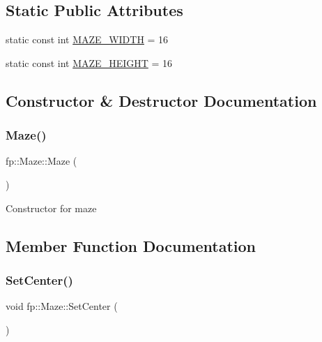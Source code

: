 \subsection*{Static Public Attributes}
\begin{DoxyCompactItemize}
\item 
static const int \hyperlink{classfp_1_1_maze_ae976c87b67bf82c41ede75a19ac28c2c}{M\+A\+Z\+E\+\_\+\+W\+I\+D\+TH} = 16
\item 
static const int \hyperlink{classfp_1_1_maze_a3cee2050b4d60bceacc9307e7016b931}{M\+A\+Z\+E\+\_\+\+H\+E\+I\+G\+HT} = 16
\end{DoxyCompactItemize}


\subsection{Constructor \& Destructor Documentation}
\mbox{\label{classfp_1_1_maze_af090b97595ed34cad9f7c8de9e79a127}} 
\subsubsection{\texorpdfstring{Maze()}{Maze()}}
{\footnotesize\ttfamily fp\+::\+Maze\+::\+Maze (\begin{DoxyParamCaption}{ }\end{DoxyParamCaption})\hspace{0.3cm}{\ttfamily [inline]}}

Constructor for maze 

\subsection{Member Function Documentation}
\mbox{\label{classfp_1_1_maze_af1ffa713840a40bdcedb99e79ea5bde3}} 
\subsubsection{\texorpdfstring{Set\+Center()}{SetCenter()}}
{\footnotesize\ttfamily void fp\+::\+Maze\+::\+Set\+Center (\begin{DoxyParamCaption}{ }\end{DoxyParamCaption})}

